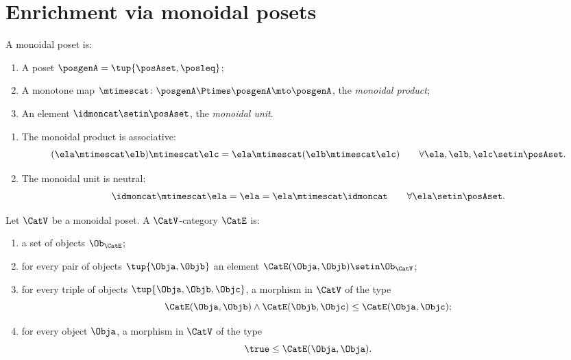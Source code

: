 
\section{Enrichment via monoidal posets}
\label{sec:quantale-enrichment}

\begin{ctdefinition}
\label{def:monoidal-poset}
A monoidal poset is: 

\constit
\begin{enumerate}
\item A poset $\posgenA = \tup{\posAset, \posleq}$;
\item A monotone map $\mtimescat \colon \posgenA \Ptimes \posgenA \mto \posgenA$, the \emph{monoidal product}; 
\item An element $\idmoncat \setin \posAset$, the \emph{monoidal unit}. 
\end{enumerate}

\condit
\begin{enumerate}
\item The monoidal product is associative: 
\begin{equation}
(\ela \mtimescat \elb) \mtimescat \elc = \ela \mtimescat (\elb \mtimescat \elc) \qquad \forall \ela, \elb, \elc \setin \posAset.
\end{equation}
\item The monoidal unit is neutral:
\begin{equation}
\idmoncat \mtimescat \ela = \ela = \ela \mtimescat \idmoncat \qquad \forall \ela \setin \posAset.
\end{equation}
 
\end{enumerate}


\end{ctdefinition}


\begin{ctdefinition}
\label{def:enriched-cat-monoidal-poset}
Let $\CatV$ be a monoidal poset. A $\CatV$-category $\CatE$ is:

\constit
\begin{enumerate}
\item a set of objects $\Ob_\CatE$; 
\item for every pair of objects $\tup{\Obja, \Objb}$ an element $\CatE(\Obja, \Objb) \setin \Ob_\CatV$; 
\item for every triple of objects $\tup{\Obja, \Objb, \Objc}$, a morphism in $\CatV$ of the type
\begin{equation}
\CatE(\Obja, \Objb) \wedge \CatE(\Objb, \Objc) \leq \CatE(\Obja, \Objc);
\end{equation}
\item for every object $\Obja$, a morphism in $\CatV$ of the type
\begin{equation}
\true \leq \CatE(\Obja, \Obja).
\end{equation}
\end{enumerate}
\end{ctdefinition}

